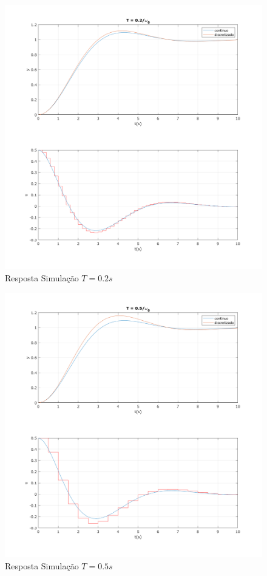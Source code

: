 \documentclass[a4paper,11pt]{article}
\begin{document}
\begin{figure}[H]
    \centering
    \includegraphics[width=0.9\linewidth]{img/exsim2-plot-sim-t02.png}
    \caption{Resposta Simulação $T=0.2s$}
\end{figure}

\begin{figure}[H]
    \centering
    \includegraphics[width=0.9\linewidth]{img/exsim2-plot-sim-t05.png}
    \caption{Resposta Simulação $T=0.5s$}
\end{figure}
\end{document}
